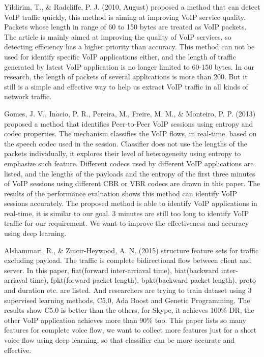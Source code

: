\documentclass[conference]{IEEEtran}
\begin{document}
Yildirim, T., \& Radcliffe, P. J. (2010, August) \cite{3} proposed a method that can detect VoIP traffic quickly, this method is aiming at improving VoIP service quality. Packets whose length in range of 60 to 150 bytes are treated as VoIP packets. The article is mainly aimed at improving the quality of VoIP services, so detecting efficiency has a higher priority than accuracy. This method can not be used for identify specific VoIP applications either, and the length of traffic generated by latest VoIP application is no longer limited to 60-150 bytes. In our research, the length of packets of several applications is more than 200. But it still is a simple and effective way to help us extract VoIP traffic in all kinds of network traffic.

Gomes, J. V., In$\acute{a}$cio, P. R., Pereira, M., Freire, M. M., \& Monteiro, P. P. (2013) \cite{4} proposed a method that identifies Peer-to-Peer VoIP sessions using entropy and codec properties. The mechanism classifies the VoIP flows, in real-time, based on the speech codec used in the session. Classifier does not use the lengths of the packets individually, it explores their level of heterogeneity using entropy to emphasize such feature. Different codecs used by different VoIP applications are listed, and the lengths of the payloads and the entropy of the first three minutes of VoIP sessions using different CBR or VBR codecs are drawn in this paper. The results of the performance evaluation shows this method can identify VoIP sessions accurately. The proposed method is able to identify VoIP applications in real-time, it is similar to our goal. 3 minutes are still too long to identify VoIP traffic for our requirement. We want to improve the effectiveness and accuracy using deep learning.

Alshammari, R., \& Zincir-Heywood, A. N. (2015) \cite{5} structure feature sets for traffic excluding payload. The traffic is complete bidirectional flow between client and server. In this paper, fiat(forward inter-arriaval time), biat(backward inter-arriaval time), fpkt(forward packet length), bpkt(backward packet length), proto and duration etc. are listed. And researchers are trying to train dataset using 3 supervised learning methods, C5.0, Ada Boost and Genetic Programming. The results show C5.0 is better than the others, for Skype, it achieves 100\% DR, the other VoIP application achieves more than 90\% too. This paper lists so many features for complete voice flow, we want to collect more features just for a short voice flow using deep learning, so that classifier can be more accurate and effective.
\end{document}
